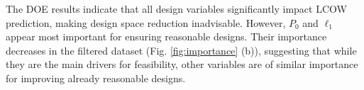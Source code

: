 \documentclass[twocolumn,10pt]{asme2e}
\begin{document}
The DOE results indicate that all design variables significantly impact LCOW prediction, making design space reduction inadvisable. However, $P_0$ and $\ell_1$ appear most important for ensuring reasonable designs. Their importance decreases in the filtered dataset (Fig. \ref{fig:importance} (b)), suggesting that while they are the main drivers for feasibility, other variables are of similar importance for improving already reasonable designs.



\end{document}
